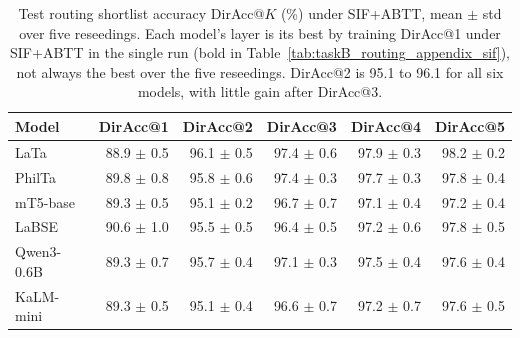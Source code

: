 \begin{table}[t]
\centering
\small
\setlength{\tabcolsep}{6pt}
\begin{tabular}{lrrrrr}
\toprule
\textbf{Model} & \textbf{DirAcc@1} & \textbf{DirAcc@2} & \textbf{DirAcc@3} & \textbf{DirAcc@4} & \textbf{DirAcc@5} \\
\midrule
LaTa       & 88.9 $\pm$ 0.5 & 96.1 $\pm$ 0.5 & 97.4 $\pm$ 0.6 & 97.9 $\pm$ 0.3 & 98.2 $\pm$ 0.2 \\
PhilTa     & 89.8 $\pm$ 0.8 & 95.8 $\pm$ 0.6 & 97.4 $\pm$ 0.3 & 97.7 $\pm$ 0.3 & 97.8 $\pm$ 0.4 \\
mT5-base   & 89.3 $\pm$ 0.5 & 95.1 $\pm$ 0.2 & 96.7 $\pm$ 0.7 & 97.1 $\pm$ 0.4 & 97.2 $\pm$ 0.4 \\
LaBSE      & 90.6 $\pm$ 1.0 & 95.5 $\pm$ 0.5 & 96.4 $\pm$ 0.5 & 97.2 $\pm$ 0.6 & 97.8 $\pm$ 0.5 \\
Qwen3-0.6B & 89.3 $\pm$ 0.7 & 95.7 $\pm$ 0.4 & 97.1 $\pm$ 0.3 & 97.5 $\pm$ 0.4 & 97.6 $\pm$ 0.4 \\
KaLM-mini  & 89.3 $\pm$ 0.5 & 95.1 $\pm$ 0.4 & 96.6 $\pm$ 0.7 & 97.2 $\pm$ 0.7 & 97.6 $\pm$ 0.5 \\
\bottomrule
\end{tabular}
\caption{Test routing shortlist accuracy DirAcc@$K$ (\%) under SIF+ABTT, mean $\pm$ std over five reseedings. Each model's layer is its best by training DirAcc@1 under SIF+ABTT in the single run (bold in Table~\ref{tab:taskB_routing_appendix_sif}), not always the best over the five reseedings. DirAcc@2 is 95.1 to 96.1 for all six models, with little gain after DirAcc@3.}
\label{tab:taskb}
\end{table}
